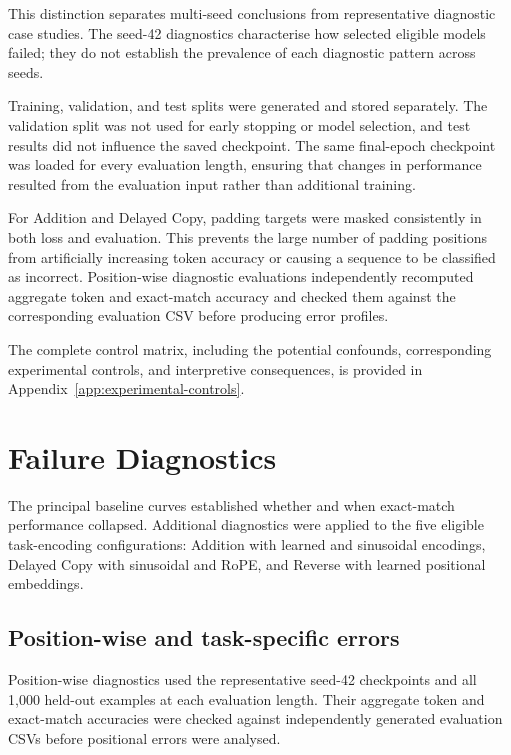 \documentclass[
    author={Aanchala Ravindra Bhongade},
    supervisor={Dr. Fernando Moreno-Pino},
    degree={MSc},
    title={Length Generalisation in Transformer-Based Sequence Models: Failure Taxonomy and Mitigation Strategies},
    subtitle={},
    type={},
    year={2026}
]{dissertation}
\begin{document}
This distinction separates multi-seed conclusions from representative diagnostic case studies. The seed-42 diagnostics characterise how selected eligible models failed; they do not establish the prevalence of each diagnostic pattern across seeds.

Training, validation, and test splits were generated and stored separately. The validation split was not used for early stopping or model selection, and test results did not influence the saved checkpoint. The same final-epoch checkpoint was loaded for every evaluation length, ensuring that changes in performance resulted from the evaluation input rather than additional training.

For Addition and Delayed Copy, padding targets were masked consistently in both loss and evaluation. This prevents the large number of padding positions from artificially increasing token accuracy or causing a sequence to be classified as incorrect. Position-wise diagnostic evaluations independently recomputed aggregate token and exact-match accuracy and checked them against the corresponding evaluation CSV before producing error profiles.

The complete control matrix, including the potential confounds, corresponding experimental controls, and interpretive consequences, is provided in Appendix~\ref{app:experimental-controls}.


\section{Failure Diagnostics}
\label{sec:failure-diagnostics}

The principal baseline curves established whether and when exact-match performance collapsed. Additional diagnostics were applied to the five eligible task-encoding configurations: Addition with learned and sinusoidal encodings, Delayed Copy with sinusoidal and RoPE, and Reverse with learned positional embeddings.

\subsection{Position-wise and task-specific errors}
\label{sec:position-diagnostics}

Position-wise diagnostics used the representative seed-42 checkpoints and all 1,000 held-out examples at each evaluation length. Their aggregate token and exact-match accuracies were checked against independently generated evaluation CSVs before positional errors were analysed.
\end{document}
